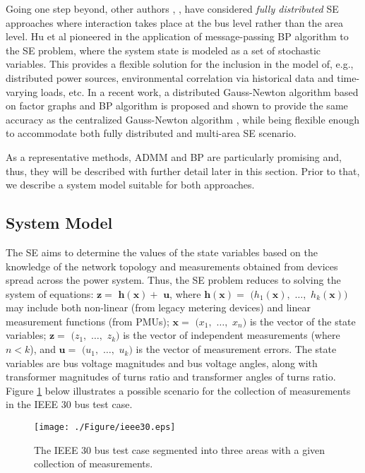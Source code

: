 \documentclass[journal]{IEEEtran}
\begin{document}
Going one step beyond, other authors \cite{kavcic}, \cite{vukobratovic}, have considered \emph{fully distributed} SE approaches where interaction takes place at the bus level rather than the area level.
Hu et al \cite{kavcic} pioneered in the application of message-passing BP algorithm to the SE problem, where the system state is modeled as a set of stochastic variables. This provides a flexible solution for the inclusion in the model of, e.g., distributed power sources, environmental correlation via historical data and time-varying loads, etc. In a recent work, a distributed Gauss-Newton algorithm based on factor graphs and BP algorithm is proposed and shown to provide the same accuracy as the centralized Gauss-Newton algorithm \cite{vukobratovic}, while being flexible enough to accommodate both fully distributed and multi-area SE scenario. 

As a representative methods, ADMM and BP are particularly promising and, thus, they will be described with further detail later in this section. Prior to that, we describe a system model suitable for both approaches.

\subsection{System Model}

The SE aims to determine the values of the state variables based on the knowledge of the network topology and measurements obtained from devices spread across the power system. Thus, the SE problem reduces to solving the system of equations: $\mathbf{z}=$ $\mathbf{h}(\mathbf{x})+$ $\mathbf{u}$, where $\mathbf{h}(\mathbf{x})=$ $(h_1(\mathbf{x}),$ $\dots,$ $h_k(\mathbf{x}))$ may include both non-linear (from legacy metering devices) and linear measurement functions (from PMUs); $\mathbf{x}=$ $(x_1,$ $\dots,$ $x_n)$ is the vector of the state variables; $\mathbf{z}=$ $(z_1,$ $\dots,$ $z_k)$ is the vector of independent measurements (where $n < k$), and $\mathbf{u}=$ $(u_1,$ $\dots,$ $u_k)$ is the vector of measurement errors. The state variables are bus voltage magnitudes and bus voltage angles, along with transformer magnitudes of turns ratio and transformer angles of turns ratio. Figure \ref{Fig_ieee30} below illustrates a possible scenario for the collection of measurements in the IEEE 30 bus test case. 
	\begin{figure}[ht]
	\centering
	\texttt{[image: ./Figure/ieee30.eps]}
	\caption{The IEEE 30 bus test case segmented into three areas 
	with a given collection of measurements.}
	\label{Fig_ieee30}
	\end{figure}
\end{document}
